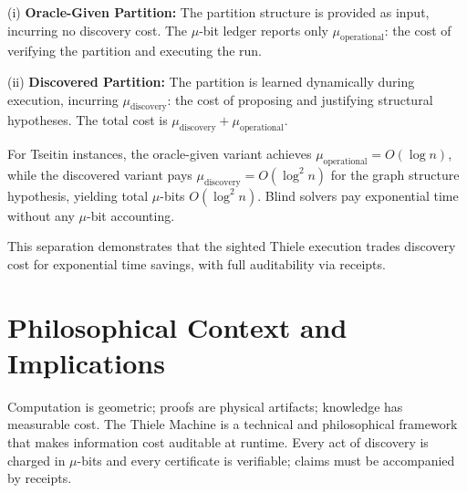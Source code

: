 \documentclass[11pt]{article}
\begin{document}
(i) \textbf{Oracle-Given Partition:} The partition structure is provided as input, incurring no discovery cost. The $\mu$-bit ledger reports only $\mu_{\text{operational}}$: the cost of verifying the partition and executing the run.

(ii) \textbf{Discovered Partition:} The partition is learned dynamically during execution, incurring $\mu_{\text{discovery}}$: the cost of proposing and justifying structural hypotheses. The total cost is $\mu_{\text{discovery}} + \mu_{\text{operational}}$.

For Tseitin instances, the oracle-given variant achieves $\mu_{\text{operational}} = O(\log n)$, while the discovered variant pays $\mu_{\text{discovery}} = O(\log^2 n)$ for the graph structure hypothesis, yielding total $\mu$-bits $O(\log^2 n)$. Blind solvers pay exponential time without any $\mu$-bit accounting.

This separation demonstrates that the sighted Thiele execution trades discovery cost for exponential time savings, with full auditability via receipts.

\section{Philosophical Context and Implications}
Computation is geometric; proofs are physical artifacts; knowledge has measurable cost. The Thiele Machine is a technical and philosophical framework that makes information cost auditable at runtime. Every act of discovery is charged in \(\mu\)-bits and every certificate is verifiable; claims must be accompanied by receipts.
\end{document}
